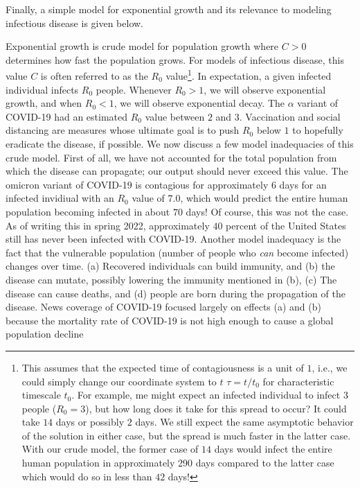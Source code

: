 Finally, a simple model for exponential growth and its relevance to modeling infectious disease is given below.


Exponential growth is  crude model for population growth where $C > 0$ determines how fast the population grows.
For models of infectious disease, this value $C$ is often referred to as the $R_0$ value\footnote{This assumes that the expected time of contagiousness is a unit of $1$, i.e., we could simply change our coordinate system to $t$ \to $\tau=t / t_0$ for characteristic timescale $t_0$. For example, me might expect an infected individual to infect $3$ people ($R_0=3$), but how long does it take for this spread to occur? It could take $14$ days or possibly $2$ days. We still expect the same asymptotic behavior of the solution in either case, but the spread is much faster in the latter case. With our crude model, the former case of $14$ days would infect the entire human population in approximately 290 days compared to the latter case which would do so in less than $42$ days!}. 
In expectation, a given infected individual infects $R_0$ people. Whenever $R_0 > 1$, we will observe exponential growth, and when $R_0 < 1$, we will observe exponential decay. 
The $\alpha$ variant of COVID-19 had an estimated $R_0$ value between $2$ and $3$. Vaccination and social distancing are measures whose ultimate goal is to push $R_0$ below $1$ to hopefully eradicate the disease, if possible.
We now discuss a few model inadequacies of this crude model. 
First of all, we have not accounted for the total population from which the disease can propagate; our output should never exceed this value. The omicron variant of COVID-19 is contagious for approximately $6$ days for an infected invidiual with an $R_0$ value of $7.0$, which would predict the entire human population becoming infected in about $70$ days! Of course, this was not the case. As of writing this in spring 2022, approximately $40$ percent of the United States still has never been infected with COVID-19.
Another model inadequacy is the fact that the vulnerable population (number of people who \textit{can} become infected) changes over time. (a) Recovered individuals can build immunity, and (b) the disease can mutate, possibly lowering the immunity mentioned in (b), (c) The disease can cause deaths, and (d) people are born during the propagation of the disease. News coverage of COVID-19 focused largely on effects (a) and (b) because the mortality rate of COVID-19 is not high enough to cause a global population decline
